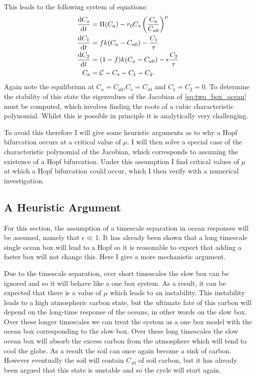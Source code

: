 This leads to the following system of equations:
\begin{subequations}
  \begin{align}
    \label{eq:two_box_ocean}
    \dv{C_s}{t} &= \Pi(C_a) - r_0 C_s \left(\frac{C_a}{C_{a0}}\right)^{\mu} \\
    \dv{C_1}{t} &= fk(C_a - C_{a0}) - \frac{C_1}{\tau} \\
    \dv{C_2}{t} &= (1-f)k(C_a-C_{a0}) - \epsilon\frac{C_2}{\tau} \\
    C_a &= \mathcal{C} - C_s - C_1 - C_2.
  \end{align}
\end{subequations}
Again note the equilibrium at $C_a = C_{a0}$,$C_s = C_{s0}$ and $C_1 = C_2 = 0$. To determine the stability of this state the eigenvalues of the Jacobian
of \cref{eq:two_box_ocean} must be computed, which involves finding the roots of a cubic characteristic polynomial.
Whilst this is possible in principle it is analytically very challenging.

To avoid this therefore I will give some heuristic arguments as to why a Hopf bifurcation occurs at a critical value of $\mu$. I will then solve a special case
of the characteristic polynomial of the Jacobian, which corresponds to assuming the existence of a Hopf bifurcation. Under this assumption I find
critical values of $\mu$ at which a Hopf bifurcation could occur, which I then verify with a numerical investigation.

\subsection{A Heuristic Argument}
For this section, the assumption of a timescale separation in ocean responses will be assumed, namely that $\epsilon \ll 1$. It has already been shown that a long timescale
single ocean box will lead to a Hopf so it is reasonable to expect that adding a faster box will not change this. Here I give a more mechanistic argument.

Due to the timescale
separation, over short timescales the slow box can be ignored and so it will behave like a one box system. As a result, it can be expected that there
is a value of $\mu$ which leads to an instability. This instability leads to a high atmospheric carbon state, but the ultimate fate of this carbon will depend on the long-time response of the oceans, in other
words on the slow box. Over these longer timescales we can treat the system as a one box model with the ocean box corresponding to the slow box.
Over these long timescales the slow ocean box will absorb the excess carbon from the atmosphere which will tend to cool the globe. As a result
the soil can once again become a sink of carbon. However eventually the soil will contain $C_{s0}$ of soil carbon, but it has already been argued that this state is unstable
and so the cycle will start again.

